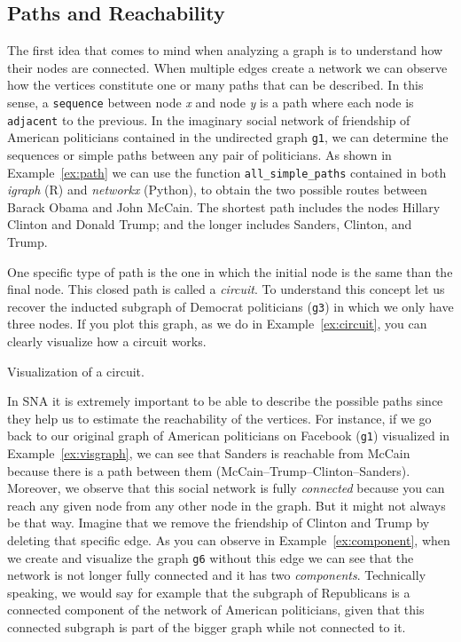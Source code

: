 \subsection{Paths and Reachability}

The first idea that comes to  mind when analyzing a graph is to understand how their nodes are connected. When multiple edges create a network we can observe how the vertices constitute one or many paths that can be described. In this sense, a \texttt{sequence} between node \textit{x} and node \textit{y} is a path where each node is \texttt{adjacent} to the previous. In the imaginary social network of friendship of American politicians contained in the undirected graph \texttt{g1}, we can determine the sequences or simple paths between any pair of politicians. As shown in Example~\ref{ex:path} we can use the function \texttt{all\_simple\_paths} contained in both \emph{igraph} (R) and \emph{networkx} (Python), to obtain the two possible routes between Barack Obama and John McCain. The shortest path includes the nodes Hillary Clinton and Donald Trump; and the longer includes Sanders, Clinton, and Trump.


One specific type of path is the one in which the initial node is the same than the final node. This closed path is called a \emph{circuit}. To understand this concept let us recover the inducted subgraph of Democrat politicians (\texttt{g3}) in which we only have three nodes. If you plot this graph, as we do in Example~\ref{ex:circuit}, you can clearly visualize how a circuit works.

\begin{ccsexample}
  \caption{Visualization of a circuit.}
  \label{ex:circuit}
\end{ccsexample}

In SNA it is extremely important to be able to describe the possible paths since they help us to estimate the reachability of the vertices. For instance, if we go back to our original graph of American politicians on Facebook (\texttt{g1}) visualized in Example~\ref{ex:visgraph}, we can see that Sanders is reachable from McCain because there is a path between them (McCain--Trump--Clinton--Sanders).  Moreover, we observe that this social network is fully \emph{connected} because you can reach any given node from any other node in the graph. But it might not always be that way. Imagine that we remove the friendship of Clinton and Trump by deleting that specific edge. As you can observe in Example~\ref{ex:component}, when we create and visualize the graph \texttt{g6} without this edge we can see that the network is not longer fully connected and it has two \emph{components}. Technically speaking, we would say for example that the subgraph of Republicans is a connected component of the network of American politicians, given that this connected subgraph is part of the bigger graph while not connected to it.

